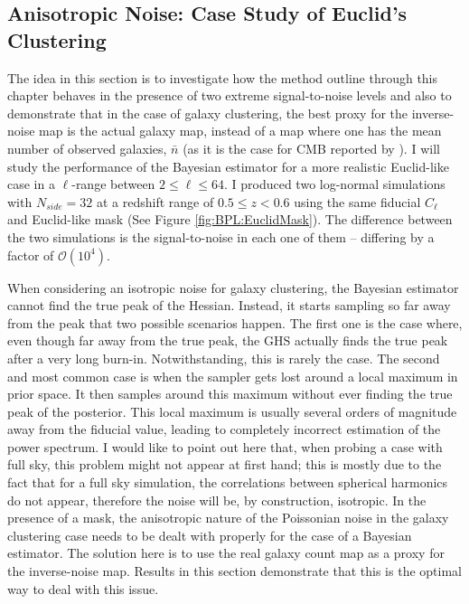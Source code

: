 \subsection{Anisotropic Noise: Case Study of Euclid's Clustering}\label{Sec:Noise}
The idea in this section is to investigate how the method outline through this chapter behaves in the presence of two extreme signal-to-noise levels and also to demonstrate that in the case of galaxy clustering, the best proxy for the inverse-noise map is the actual galaxy map, instead of a map where one has the mean number of observed galaxies, $\bar{n}$ (as it is the case for CMB reported by \cite{SreeThesis}). I will study the performance of the Bayesian estimator for a more realistic Euclid-like case in a $\ell$-range between $2 \leq \ell \leq 64$. I produced two log-normal simulations with $N_{side}=32$ at a redshift range of $0.5 \leq z < 0.6$ using the same fiducial $C_{\ell}$ and Euclid-like mask (See Figure \ref{fig:BPL:EuclidMask}). The difference between the two simulations is the signal-to-noise in each one of them -- differing by a factor of $\mathcal{O}(10^4)$. 

\qquad When considering an isotropic noise for galaxy clustering, the Bayesian estimator cannot find the true peak of the Hessian. Instead, it starts sampling so far away from the peak that two possible scenarios happen. The first one is the case where, even though far away from the true peak, the GHS actually finds the true peak after a very long burn-in. Notwithstanding, this is rarely the case. The second and most common case is when the sampler gets lost around a local maximum in prior space. It then samples around this maximum without ever finding the true peak of the posterior. This local maximum is usually several orders of magnitude away from the fiducial value, leading to completely incorrect estimation of the power spectrum. I would like to point out here that, when probing a case with full sky, this problem might not appear at first hand; this is mostly due to the fact that for a full sky simulation, the correlations between spherical harmonics do not appear, therefore the noise will be, by construction, isotropic. In the presence of a mask, the anisotropic nature of the Poissonian noise in the galaxy clustering case needs to be dealt with properly for the case of a Bayesian estimator. The solution here is to use the real galaxy count map as a proxy for the inverse-noise map. Results in this section demonstrate that this is the optimal way to deal with this issue.

